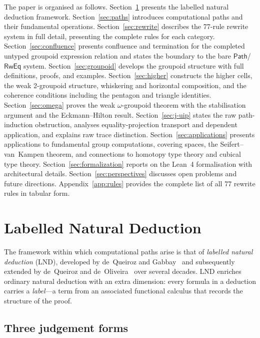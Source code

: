 \documentclass[manuscript]{BSLstyle}
\newcommand{\Path}{\mathsf{Path}}
\newcommand{\RwEq}{\mathsf{RwEq}}
\begin{document}
The paper is organised as follows.
Section~\ref{sec:lnd} presents the labelled natural deduction framework.
Section~\ref{sec:paths} introduces computational paths and their
fundamental operations.
Section~\ref{sec:rewrite} describes the 77-rule rewrite system in full
detail, presenting the complete rules for each category.
Section~\ref{sec:confluence} presents confluence and termination for the
completed untyped groupoid expression relation and states the boundary to the
bare \(\Path\)/\(\RwEq\) system.
Section~\ref{sec:groupoid} develops the groupoid structure with full
definitions, proofs, and examples.
Section~\ref{sec:higher} constructs the higher cells, the weak
2-groupoid structure, whiskering and horizontal composition, and the
coherence conditions including the pentagon and triangle identities.
Section~\ref{sec:omega} proves the weak $\omega$-groupoid theorem with
the stabilisation argument and the Eckmann--Hilton result.
Section~\ref{sec:j-uip} states the raw path-induction obstruction, analyses
equality-projection transport and dependent application, and explains raw
trace distinction.
Section~\ref{sec:applications} presents applications to fundamental group
computations, covering spaces, the Seifert--van~Kampen theorem, and
connections to homotopy type theory and cubical type theory.
Section~\ref{sec:formalization} reports on the Lean~4 formalisation with
architectural details.
Section~\ref{sec:perspectives} discusses open problems and future directions.
Appendix~\ref{app:rules} provides the complete list of all 77 rewrite rules
in tabular form.

\section{Labelled Natural Deduction}\label{sec:lnd}

The framework within which computational paths arise is that of
\emph{labelled natural deduction} (LND), developed by de~Queiroz
and Gabbay~\cite{GabbaydeQueiroz92:c-h:full} and subsequently extended
by de~Queiroz and de~Oliveira~\cite{deQueiroz94,deQueiroz2012} over
several decades.  LND enriches ordinary natural deduction with an extra
dimension: every formula in a deduction carries a \emph{label}---a term
from an associated functional calculus that records the structure of
the proof.

\subsection{Three judgement forms}
\end{document}
